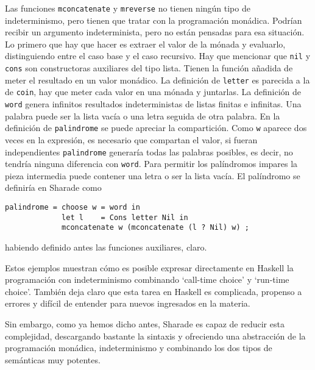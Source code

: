 \documentclass[class=article, crop=false]{standalone}
\begin{document}
Las funciones \verb`mconcatenate` y \verb`mreverse` no tienen ningún tipo de indeterminismo,
pero tienen que tratar con la programación monádica. Podrían recibir un argumento
indeterminista, pero no están pensadas para esa situación. Lo primero que hay que hacer es
extraer el valor de la mónada y evaluarlo, distinguiendo entre el caso base y el caso
recursivo. Hay que mencionar que \verb`nil` y \verb`cons` son constructoras auxiliares del
tipo lista. Tienen la función añadida de meter el resultado en un valor monádico. La
definición de \verb`letter` es parecida a la de \verb`coin`, hay que meter cada valor en una
mónada y juntarlas. La definición de \verb`word` genera infinitos resultados indeterministas
de listas finitas e infinitas. Una palabra puede ser la lista vacía o una letra seguida de
otra palabra. En la definición de \verb`palindrome` se puede apreciar la compartición. Como
\verb`w` aparece dos veces en la expresión, es necesario que compartan el valor, si fueran
independientes \verb`palindrome` generaría todas las palabras posibles, es decir, no tendría
ninguna diferencia con \verb`word`. Para permitir los palíndromos impares la pieza intermedia
puede contener una letra o ser la lista vacía. El palíndromo se definiría en Sharade como
\begin{verbatim}
palindrome = choose w = word in
             let l    = Cons letter Nil in
             mconcatenate w (mconcatenate (l ? Nil) w) ;
\end{verbatim}
habiendo definido antes las funciones auxiliares, claro.

Estos ejemplos muestran cómo es posible expresar directamente en Haskell la programación con
indeterminismo combinando `call-time choice' y `run-time choice'. También deja claro que esta
tarea en Haskell es complicada, propenso a errores y difícil de entender para nuevos
ingresados en la materia.

Sin embargo, como ya hemos dicho antes, Sharade es capaz de reducir esta complejidad,
descargando bastante la sintaxis y ofreciendo una abstracción de la programación monádica,
indeterminismo y combinando los dos tipos de semánticas muy potentes.
\end{document}
